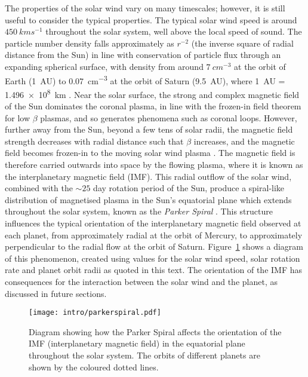 The properties of the solar wind vary on many timescales; however, it is still useful to consider the typical properties. The typical solar wind speed is around $\SI{450}{kms^{-1}}$ throughout the solar system, well above the local speed of sound. The particle number density falls approximately as $r^{-2}$ (the inverse square of radial distance from the Sun) in line with conservation of particle flux through an expanding spherical surface, with density from around $\SI{7}{cm^{-3}}$ at the orbit of Earth (\SI{1}{AU}) to \SI{0.07}{cm^{-3}} at the orbit of Saturn (\SI{9.5}{AU}), where \SI{1}{AU} = \SI{1.496e8}{km} \citep{bagenal2014}. Near the solar surface, the strong and complex magnetic field of the Sun dominates the coronal plasma, in line with the frozen-in field theorem for low $\beta$ plasmas, and so generates phenomena such as coronal loops. However, further away from the Sun, beyond a few tens of solar radii, the magnetic field strength decreases with radial distance such that $\beta$ increases, and the magnetic field becomes frozen-in to the moving solar wind plasma \citep{russell2016}. The magnetic field is therefore carried outwards into space by the flowing plasma, where it is known as the interplanetary magnetic field (IMF). This radial outflow of the solar wind, combined with the ${\sim}25$ day rotation period of the Sun, produce a spiral-like distribution of magnetised plasma in the Sun's equatorial plane which extends throughout the solar system, known as the \textit{Parker Spiral} \citep{parker1958}. This structure influences the typical orientation of the interplanetary magnetic field observed at each planet, from approximately radial at the orbit of Mercury, to approximately perpendicular to the radial flow at the orbit of Saturn. Figure~\ref{intro:fig:parkerspiral} shows a diagram of this phenomenon, created using values for the solar wind speed, solar rotation rate and planet orbit radii as quoted in this text. The orientation of the IMF has consequences for the interaction between the solar wind and the planet, as discussed in future sections.

\begin{figure}
\centering
\noindent\texttt{[image: intro/parkerspiral.pdf]}
\caption[Diagram of the Parker Spiral throughout the solar system.]{Diagram showing how the Parker Spiral affects the orientation of the IMF (interplanetary magnetic field) in the equatorial plane throughout the solar system. The orbits of different planets are shown by the coloured dotted lines.}
\label{intro:fig:parkerspiral}
\end{figure}

